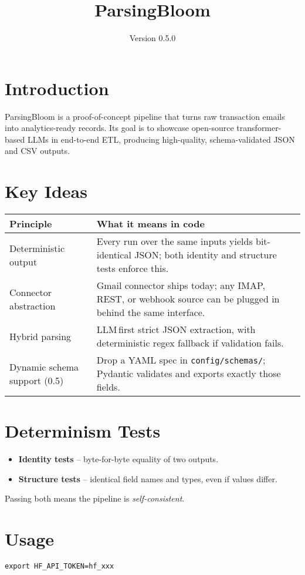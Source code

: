 \documentclass{article}
\title{ParsingBloom}
\date{Version 0.5.0}
\begin{document}
	
	\maketitle
	
	\section{Introduction}
	ParsingBloom is a proof-of-concept pipeline that turns raw transaction emails into analytics-ready records.  Its goal is to showcase open-source transformer-based LLMs in end-to-end ETL, producing high-quality, schema-validated JSON and CSV outputs.
	
	\section{Key Ideas}
	\begin{tabular}{@{}p{4cm}p{10cm}@{}}
		\toprule
		\textbf{Principle} & \textbf{What it means in code} \\ \midrule
		Deterministic output & Every run over the same inputs yields bit-identical JSON; both identity and structure tests enforce this. \\
		Connector abstraction & Gmail connector ships today; any IMAP, REST, or webhook source can be plugged in behind the same interface. \\
		Hybrid parsing & LLM\,first strict JSON extraction, with deterministic regex fallback if validation fails. \\
		Dynamic schema support (0.5) & Drop a YAML spec in \texttt{config/schemas/}; Pydantic validates and exports exactly those fields. \\
		\bottomrule
	\end{tabular}
	
	\section{Determinism Tests}
	\begin{itemize}
		\item \textbf{Identity tests} – byte-for-byte equality of two outputs.  
		\item \textbf{Structure tests} – identical field names and types, even if values differ.  
	\end{itemize}
	Passing both means the pipeline is \emph{self-consistent}.
	
	\section{Usage}
	\texttt{export HF\_API\_TOKEN=hf\_xxx}
	
\end{document}
